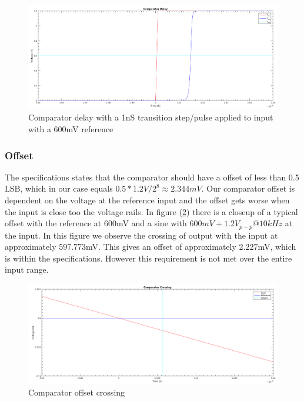 \documentclass[english, 12pt, a4paper]{ifimaster}
\begin{document}
\begin{figure}[!ht]
    \centering
    \includegraphics[width=\textwidth]{img/comparator/comparator_delay_1ns_tr_600mv_ref}
    \caption{Comparator delay with a 1nS transition step/pulse applied to input with a 600mV reference}
    \label{figure:comparator:comparator_delay}
\end{figure}



\subsubsection{Offset}
The specifications states that the comparator should have a offset of less than 0.5 LSB, which in our case equals \(0.5 * 1.2V/2^8 \approx 2.344mV\). 
Our comparator offset is dependent on the voltage at the reference input and the offset gets worse when the input is close too the voltage rails.
In figure (\ref{figure:comparator:comparator_crossing}) there is a closeup of a typical offset with the reference at 600mV and a sine with \(600mV +    1.2V_{p-p} @ 10kHz\) at the input. 
In this figure we observe the crossing of output with the input at approximately 597.773mV. This gives an offset of approximately 2.227mV, which is within the specifications. 
However this requirement is not met over the entire input range.

\begin{figure}[!ht]
    \centering
    \includegraphics[width=\textwidth]{img/comparator/comparator_crossing}
    \caption{Comparator offset crossing}
    \label{figure:comparator:comparator_crossing}
\end{figure}
\end{document}
